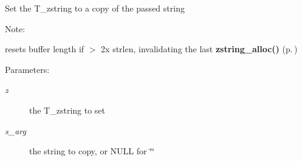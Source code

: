 Set the T\_\-zstring to a copy of the passed string \begin{Desc}
\item[Note: ]\par
resets buffer length if $>$ 2x strlen, invalidating the last {\bf zstring\_\-alloc()} {\rm (p.\,\pageref{zstring_8h_a6})} \end{Desc}
\begin{Desc}
\item[Parameters: ]\par
\begin{description}
\item[{\em 
z}]the T\_\-zstring to set \item[{\em 
s\_\-arg}]the string to copy, or NULL for \char`\"{}\char`\"{} \end{description}
\end{Desc}
